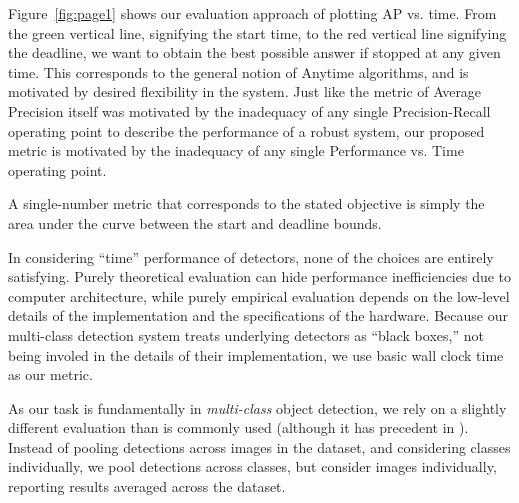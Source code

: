 Figure~\ref{fig:page1} shows our evaluation approach of plotting AP vs. time.
From the green vertical line, signifying the start time, to the red vertical line signifying the deadline, we want to obtain the best possible answer if stopped at any given time.
This corresponds to the general notion of Anytime algorithms, and is motivated by desired flexibility in the system.
Just like the metric of Average Precision itself was motivated by the inadequacy of any single Precision-Recall operating point to describe the performance of a robust system, our proposed metric is motivated by the inadequacy of any single Performance vs. Time operating point.

A single-number metric that corresponds to the stated objective is simply the area under the curve between the start and deadline bounds.

In considering ``time'' performance of detectors, none of the choices are entirely satisfying. 
Purely theoretical evaluation can hide performance inefficiencies due to computer architecture, while purely empirical evaluation depends on the low-level details of the implementation and the specifications of the hardware.
Because our multi-class detection system treats underlying detectors as ``black boxes,'' not being involed in the details of their implementation, we use basic wall clock time as our metric.

As our task is fundamentally in \emph{multi-class} object detection, we rely on a slightly different evaluation than is commonly used (although it has precedent in \cite{Desai2009}).
Instead of pooling detections across images in the dataset, and considering classes individually, we pool detections across classes, but consider images individually, reporting results averaged across the dataset.
